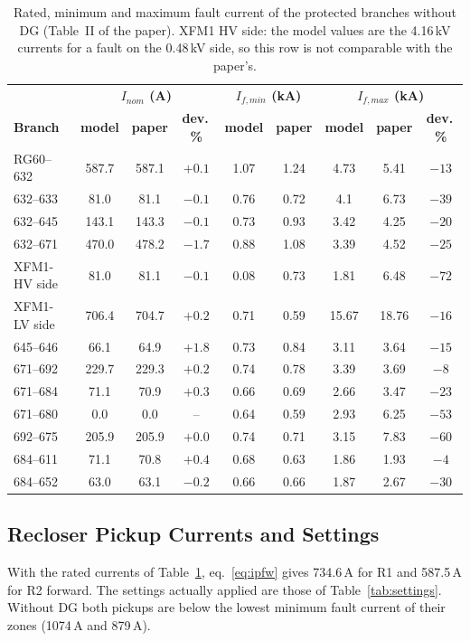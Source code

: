 \documentclass[12pt,letterpaper]{article}
\newcommand{\hd}{\rowcolor{headc}}
\begin{document}
\begin{table}[H]
\centering\footnotesize
\begin{tabular}{@{}lcccccccc@{}}
\toprule
\hd & \multicolumn{3}{c}{\textbf{$I_{nom}$ (A)}} & \multicolumn{2}{c}{\textbf{$I_{f,min}$ (kA)}} & \multicolumn{3}{c}{\textbf{$I_{f,max}$ (kA)}} \\
\hd\textbf{Branch} & \textbf{model} & \textbf{paper} & \textbf{dev.\,\%} & \textbf{model} & \textbf{paper} & \textbf{model} & \textbf{paper} & \textbf{dev.\,\%} \\
\midrule
RG60--632 & 587.7 & 587.1 & $+0.1$ & 1.07 & 1.24 & 4.73 & 5.41 & $-13$ \\
632--633 & 81.0 & 81.1 & $-0.1$ & 0.76 & 0.72 & 4.1 & 6.73 & $-39$ \\
632--645 & 143.1 & 143.3 & $-0.1$ & 0.73 & 0.93 & 3.42 & 4.25 & $-20$ \\
632--671 & 470.0 & 478.2 & $-1.7$ & 0.88 & 1.08 & 3.39 & 4.52 & $-25$ \\
XFM1-HV side & 81.0 & 81.1 & $-0.1$ & 0.08 & 0.73 & 1.81 & 6.48 & $-72$ \\
XFM1-LV side & 706.4 & 704.7 & $+0.2$ & 0.71 & 0.59 & 15.67 & 18.76 & $-16$ \\
645--646 & 66.1 & 64.9 & $+1.8$ & 0.73 & 0.84 & 3.11 & 3.64 & $-15$ \\
671--692 & 229.7 & 229.3 & $+0.2$ & 0.74 & 0.78 & 3.39 & 3.69 & $-8$ \\
671--684 & 71.1 & 70.9 & $+0.3$ & 0.66 & 0.69 & 2.66 & 3.47 & $-23$ \\
671--680 & 0.0 & 0.0 & -- & 0.64 & 0.59 & 2.93 & 6.25 & $-53$ \\
692--675 & 205.9 & 205.9 & $+0.0$ & 0.74 & 0.71 & 3.15 & 7.83 & $-60$ \\
684--611 & 71.1 & 70.8 & $+0.4$ & 0.68 & 0.63 & 1.86 & 1.93 & $-4$ \\
684--652 & 63.0 & 63.1 & $-0.2$ & 0.66 & 0.66 & 1.87 & 2.67 & $-30$ \\
\bottomrule
\end{tabular}
\caption{Rated, minimum and maximum fault current of the protected branches without DG (Table~II of the paper).
XFM1 HV side: the model values are the 4.16\,kV currents for a fault on the 0.48\,kV side, so this row is not
comparable with the paper's.}
\label{tab:t2}
\end{table}

\subsection{Recloser Pickup Currents and Settings}
With the rated currents of Table~\ref{tab:t2}, eq.~\eqref{eq:ipfw} gives 734.6\,A for R1 and 587.5\,A for R2
forward. The settings actually applied are those of Table~\ref{tab:settings}. Without DG both pickups are
below the lowest minimum fault current of their zones (1074\,A and 879\,A).
\end{document}
